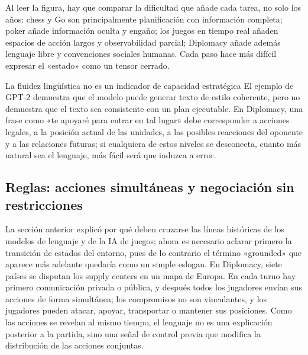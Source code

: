 
Al leer la figura, hay que comparar la dificultad que añade cada tarea, no solo los años: chess y Go son principalmente planificación con información completa; poker añade información oculta y engaño; los juegos en tiempo real añaden espacios de acción largos y observabilidad parcial; Diplomacy añade además lenguaje libre y convenciones sociales humanas. Cada paso hace más difícil expresar el «estado» como un tensor cerrado.


\begin{warningbox}{La fluidez lingüística no es un indicador de capacidad estratégica}
El ejemplo de GPT-2 demuestra que el modelo puede generar texto de estilo coherente, pero no demuestra que el texto sea consistente con un plan ejecutable. En Diplomacy, una frase como «te apoyaré para entrar en tal lugar» debe corresponder a acciones legales, a la posición actual de las unidades, a las posibles reacciones del oponente y a las relaciones futuras; si cualquiera de estos niveles se desconecta, cuanto más natural sea el lenguaje, más fácil será que induzca a error.
\end{warningbox}

\subsection{Reglas: acciones simultáneas y negociación sin restricciones}

La sección anterior explicó por qué deben cruzarse las líneas históricas de los modelos de lenguaje y de la IA de juegos; ahora es necesario aclarar primero la transición de estados del entorno, pues de lo contrario el término «grounded» que aparece más adelante quedaría como un simple eslogan. En Diplomacy, siete países se disputan los supply centers en un mapa de Europa. En cada turno hay primero comunicación privada o pública, y después todos los jugadores envían sus acciones de forma simultánea; los compromisos no son vinculantes, y los jugadores pueden atacar, apoyar, transportar o mantener sus posiciones. Como las acciones se revelan al mismo tiempo, el lenguaje no es una explicación posterior a la partida, sino una señal de control previa que modifica la distribución de las acciones conjuntas.

